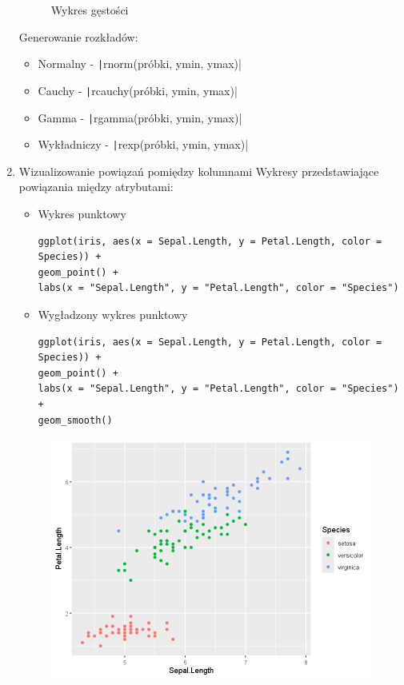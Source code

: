 \documentclass[11pt]{article}
\begin{document}
\begin{enumerate}
\begin{figure}[H]
\begin{minipage}{.5\textwidth}
        		\caption{Wykres gęstości}
        	\end{minipage}
        \end{figure}
        Generowanie rozkładów:
        \begin{itemize}
        	\item Normalny - \texttt|rnorm(próbki, ymin, ymax)|
        	\item Cauchy - \texttt|rcauchy(próbki, ymin, ymax)|
        	\item Gamma - \texttt|rgamma(próbki, ymin, ymax)|
        	\item Wykładniczy - \texttt|rexp(próbki, ymin, ymax)|
        \end{itemize}
        
        \clearpage
        \item Wizualizowanie powiązań pomiędzy kolumnami
        Wykresy przedstawiające powiązania między atrybutami:
        \begin{itemize}
        	\item Wykres punktowy
        	\begin{verbatim}
ggplot(iris, aes(x = Sepal.Length, y = Petal.Length, color = Species)) + 
geom_point() + 
labs(x = "Sepal.Length", y = "Petal.Length", color = "Species")
        	\end{verbatim}
        	\item Wygładzony wykres punktowy
        	\begin{verbatim}
ggplot(iris, aes(x = Sepal.Length, y = Petal.Length, color = Species)) + 
geom_point() + 
labs(x = "Sepal.Length", y = "Petal.Length", color = "Species") + 
geom_smooth()
        	\end{verbatim}
        \end{itemize}
        \begin{figure}[H]
        	\begin{minipage}{.5\textwidth}
        		\centering
        		\includegraphics[width=\textwidth]{imgs/ggplot_point}

\end{minipage}
\end{figure}
\end{enumerate}
\end{document}
